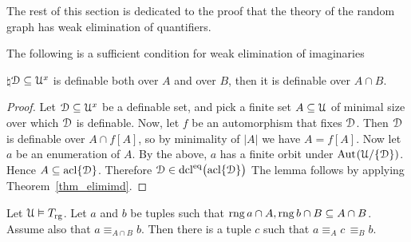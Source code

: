 The rest of this section is dedicated to the proof that the theory of the random graph has weak elimination of quantifiers.

\begin{lemma}\label{lem_suff_wei}
  The following is a sufficient condition for weak elimination of imaginaries

  $\natural$\qquad $\EuScript D\subseteq\EuScript U^{x}$ is definable both over $A$ and over $B$, then it is definable over $A\cap B$.
\end{lemma}

\begin{proof}
  Let $\EuScript D\subseteq\EuScript U^{x}$ be a definable set, and pick a finite set $A\subseteq\EuScript U$ of minimal size over which $\EuScript D$ is definable. 
  Now, let $f$ be an automorphism that fixes $\EuScript D$. Then $\EuScript D$ is definable over $A\cap f[A]$, so by minimality of $|A|$ we have $A= f[A]$. 
  Now let $a$ be an enumeration of $A$.
  By the above, $a$ has a finite orbit under ${\rm Aut\kern.15ex}(\EuScript U/\{\EuScript D\})$.
  Hence $A\subseteq{\rm acl}\{\EuScript D\}$.
  Therefore $\EuScript D\in{\rm dcl}^{{\rm eq}}\big({\rm acl}\{\EuScript D\}\big)$
  The lemma follows by applying Theorem~\ref{thm_elimimd}.
\end{proof}

\begin{lemma}\label{lem_type_amalgamation}
  Let $\EuScript U\vDash T_{\rm rg}$.
  Let $a$ and $b$ be tuples such that $\mathop{\rm rng} a\cap A,\mathop{\rm rng} b\cap B\subseteq A\cap B$.
  Assume also that $a\equiv_{A\cap B}b$.
  Then there is a tuple $c$ such that $a\equiv_A c\,\equiv_B b$.
\end{lemma}

